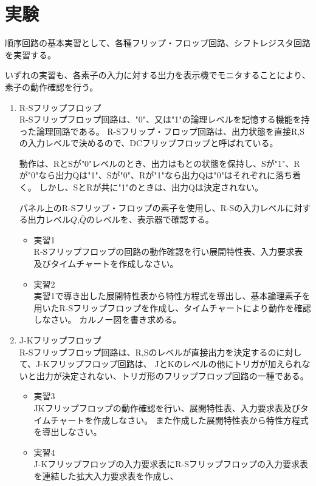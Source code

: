 \documentclass[dvipdfmx, a4paper]{jsarticle}
\begin{document}
	\section{実験}
		順序回路の基本実習として、各種フリップ・フロップ回路、シフトレジスタ回路を実習する。\par
		いずれの実習も、各素子の入力に対する出力を表示機でモニタすることにより、素子の動作確認を行う。
		\begin{enumerate}
			\item R-Sフリップフロップ \\
				R-Sフリップフロップ回路は、"0"、又は"1"の論理レベルを記憶する機能を持った論理回路である。
				R-Sフリップ・フロップ回路は、出力状態を直接R,Sの入力レベルで決めるので、DCフリップフロップと呼ばれている。\par
				動作は、RとSが"0"レベルのとき、出力はもとの状態を保持し、Sが"1"、Rが"0"なら出力Qは"1"、Sが"0"、Rが"1"なら出力Qは"0"はそれぞれに落ち着く。
				しかし、SとRが共に"1"のときは、出力Qは決定されない。\par
				パネル上のR-Sフリップ・フロップの素子を使用し、R-Sの入力レベルに対する出力レベル$Q$,$\bar{Q}$のレベルを、表示器で確認する。
				\begin{itemize}
					\item 実習1 \\
					R-Sフリップフロップの回路の動作確認を行い展開特性表、入力要求表及びタイムチャートを作成しなさい。
					\item 実習2 \\
					実習1で導き出した展開特性表から特性方程式を導出し、基本論理素子を用いたR-Sフリップフロップを作成し、タイムチャートにより動作を確認しなさい。
					カルノー図を書き求める。
				\end{itemize}
			\item J-Kフリップフロップ \\
				R-Sフリップフロップ回路は、R,Sのレベルが直接出力を決定するのに対して、J-Kフリップフロップ回路は、
				JとKのレベルの他にトリガが加えられないと出力が決定されない、トリガ形のフリップフロップ回路の一種である。\par
				\begin{itemize}
					\item 実習3 \\
						JKフリップフロップの動作確認を行い、展開特性表、入力要求表及びタイムチャートを作成しなさい。
						また作成した展開特性表から特性方程式を導出しなさい。
					\item 実習4 \\
						J-Kフリップフロップの入力要求表にR-Sフリップフロップの入力要求表を連結した拡大入力要求表を作成し、

\end{itemize}
\end{enumerate}
\end{document}
